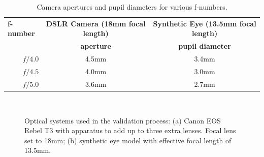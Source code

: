 
\begin{table}[h]
	\centering
	\caption{Camera apertures and pupil diameters for various f-numbers.}
	\label{table:pupildiameter}
	\begin{tabular}{rcc}
		\multicolumn{1}{l}{\bf f-number} & {\bf DSLR Camera (18mm focal length)} & {\bf Synthetic Eye (13.5mm focal length)} \\
		{\bf }               & {\bf aperture}     & {\bf pupil diameter}     \\
		{\bf $f/4.0$}         & 4.5mm                    & 3.4mm                        \\
		{\bf $f/4.5$}         & 4.0mm                    & 3.0mm                        \\
		{\bf $f/5.0$}         & 3.6mm                    & 2.7mm                        
	\end{tabular}
\end{table}

\begin{figure}[h]
	\centering
	
	~
	
	\caption[Optical systems used in the validation process]{Optical systems used in the validation process: (a) Canon EOS Rebel T3 with apparatus to add up to three extra lenses. Focal lens set to 18mm; (b) synthetic eye model with effective focal length of 13.5mm.}
	\label{fig:camera}
\end{figure}